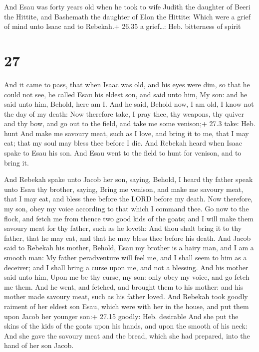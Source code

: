  And Esau was forty years old when he took to wife Judith
the daughter of Beeri the Hittite, and Bashemath the daughter of Elon
the Hittite:  Which were a grief of mind unto Isaac and to
Rebekah.+ 26.35 a grief\ldots: Heb. bitterness of spirit

\hypertarget{section-26}{%
\section{27}\label{section-26}}

 And it came to pass, that when Isaac was old, and his eyes
were dim, so that he could not see, he called Esau his eldest son, and
said unto him, My son: and he said unto him, Behold, here am I.
 And he said, Behold now, I am old, I know not the day of my
death:  Now therefore take, I pray thee, thy weapons, thy
quiver and thy bow, and go out to the field, and take me some venison;+
27.3 take: Heb. hunt  And make me savoury meat, such as I
love, and bring it to me, that I may eat; that my soul may bless thee
before I die.  And Rebekah heard when Isaac spake to Esau
his son. And Esau went to the field to hunt for venison, and to bring
it.

 And Rebekah spake unto Jacob her son, saying, Behold, I
heard thy father speak unto Esau thy brother, saying,  Bring
me venison, and make me savoury meat, that I may eat, and bless thee
before the LORD before my death.  Now therefore, my son,
obey my voice according to that which I command thee.  Go
now to the flock, and fetch me from thence two good kids of the goats;
and I will make them savoury meat for thy father, such as he loveth:
 And thou shalt bring it to thy father, that he may eat,
and that he may bless thee before his death.  And Jacob
said to Rebekah his mother, Behold, Esau my brother is a hairy man, and
I am a smooth man:  My father peradventure will feel me,
and I shall seem to him as a deceiver; and I shall bring a curse upon
me, and not a blessing.  And his mother said unto him, Upon
me be thy curse, my son: only obey my voice, and go fetch me them.
 And he went, and fetched, and brought them to his mother:
and his mother made savoury meat, such as his father loved.
 And Rebekah took goodly raiment of her eldest son Esau,
which were with her in the house, and put them upon Jacob her younger
son:+ 27.15 goodly: Heb. desirable  And she put the skins
of the kids of the goats upon his hands, and upon the smooth of his
neck:  And she gave the savoury meat and the bread, which
she had prepared, into the hand of her son Jacob.


